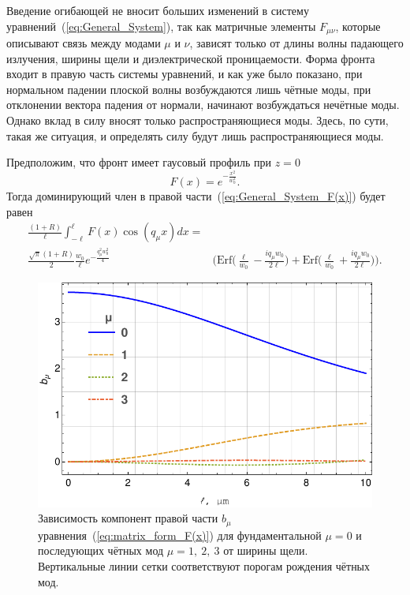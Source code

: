 Введение огибающей не вносит больших изменений в систему уравнений~(\ref{eq:General_System}), так как матричные элементы $F_{\mu \nu}$, которые описывают связь между модами $\mu$ и $\nu$, зависят только от длины волны падающего излучения, ширины щели и диэлектрической проницаемости. Форма фронта входит в правую часть системы уравнений, и как уже было показано, при нормальном падении плоской волны возбуждаются лишь чётные моды, при отклонении вектора падения от нормали, начинают возбуждаться нечётные моды. Однако вклад в силу вносят только распространяющиеся моды. Здесь, по сути, такая же ситуация, и определять силу будут лишь распространяющиеся моды. 

Предположим, что фронт имеет гаусовый профиль при $z = 0$
\begin{equation}
    F(x) = e^{-\frac{x^2}{w_0^2}}.
\end{equation}
Тогда доминирующий член в правой части~(\ref{eq:General_System_F(x)}) будет равен
    \begin{align}
    \frac{(1+R)}{\ell}\int_{-\ell}^\ell F(x) \cos(q_\mu x) dx =& \nonumber \\ \frac{\sqrt{\pi}(1+R)}{2}\frac{w_0}{\ell}e^{-\frac{q_\mu^2 w_0^2}{4}} & \Bigg( \text{Erf}\Big(\frac{\ell}{w_0} - \frac{i q_\mu w_0}{2 \ell}\Big) + \text{Erf}\Big(\frac{\ell}{w_0} + \frac{i q_\mu w_0}{2 \ell}\Big) \Bigg).
\end{align}
\begin{figure}
    \centering
    \includegraphics[width = \textwidth]{figures/Bm.pdf}
    \caption{Зависимость компонент правой части $b_\mu$ уравнения~(\ref{eq:matrix_form_F(x)}) для фундаментальной $\mu = 0$ и последующих чётных мод $\mu = 1,\ 2,\ 3$ от ширины щели. Вертикальные линии сетки соответствуют порогам рождения чётных мод.}
    \label{fig:b_mu_F(x)}
\end{figure}

